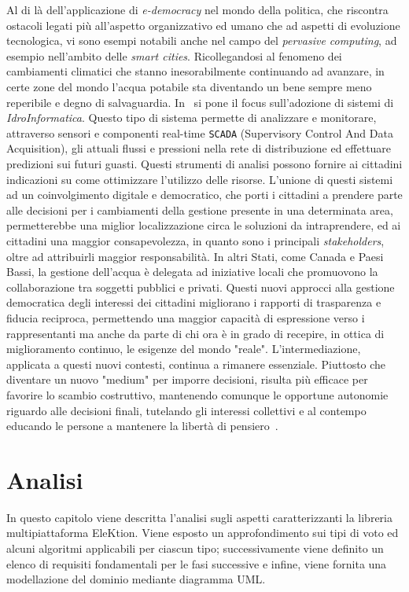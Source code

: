\documentclass[12pt,a4paper,openright,twoside]{book}
\begin{document}
Al di là dell'applicazione di \textit{e-democracy} nel mondo della politica, che riscontra
ostacoli legati più all'aspetto organizzativo ed umano che ad aspetti di evoluzione tecnologica,
vi sono esempi notabili anche nel campo del \textit{pervasive computing}, ad esempio nell'ambito delle \textit{smart cities}.
Ricollegandosi al fenomeno dei cambiamenti climatici che stanno inesorabilmente continuando ad avanzare,
in certe zone del mondo l'acqua potabile sta diventando un bene sempre meno reperibile e degno di salvaguardia.
In~\cite{smartwater} si pone il focus sull'adozione di sistemi di \textit{IdroInformatica}. Questo tipo di sistema permette di analizzare 
e monitorare, attraverso sensori e componenti real-time \texttt{SCADA} (Supervisory Control And Data Acquisition), gli attuali flussi e pressioni nella
rete di distribuzione ed effettuare predizioni sui futuri guasti. Questi strumenti di analisi possono fornire ai cittadini
indicazioni su come ottimizzare l'utilizzo delle risorse. L'unione di questi sistemi ad un coinvolgimento digitale e democratico,
che porti i cittadini a prendere parte alle decisioni per i cambiamenti della gestione presente in una determinata area,
permetterebbe una miglior localizzazione circa le soluzioni da intraprendere, ed ai cittadini una maggior consapevolezza, in quanto sono i principali \textit{stakeholders}, 
oltre ad attribuirli maggior responsabilità.
In altri Stati, come Canada e Paesi Bassi, la gestione dell'acqua è delegata ad iniziative locali che promuovono la collaborazione tra soggetti pubblici e privati.
Questi nuovi approcci alla gestione democratica degli interessi dei cittadini migliorano i rapporti di trasparenza e fiducia reciproca, permettendo una maggior capacità di espressione
verso i rappresentanti ma anche da parte di chi ora è in grado di recepire, in ottica di miglioramento continuo,
le esigenze del mondo "reale". 
L'intermediazione, applicata a questi nuovi contesti, continua a rimanere essenziale.
Piuttosto che diventare un nuovo "medium" per imporre decisioni, risulta più efficace per
favorire lo scambio costruttivo, mantenendo comunque le opportune autonomie riguardo alle
decisioni finali, tutelando gli interessi collettivi e al contempo educando le persone a mantenere
la libertà di pensiero~\cite{castelfranchi2019problematic}.



\chapter{Analisi}
In questo capitolo viene descritta l'analisi sugli aspetti caratterizzanti la libreria multipiattaforma EleKtion.
Viene esposto un approfondimento sui tipi di voto
ed alcuni algoritmi applicabili per ciascun tipo; successivamente viene definito un 
elenco di requisiti fondamentali per le fasi successive e infine,
viene fornita una modellazione del dominio mediante diagramma UML.
\end{document}
